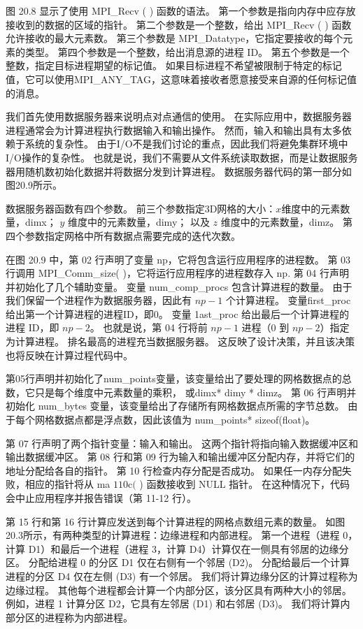 图 20.8 显示了使用 MPI\_Recv ( ) 函数的语法。 第一个参数是指向内存中应存放接收到的数据的区域的指针。 
第二个参数是一个整数，给出 MPI\_Recv ( ) 函数允许接收的最大元素数。 
第三个参数是 MPI\_Datatype，它指定要接收的每个元素的类型。 第四个参数是一个整数，给出消息源的进程 ID。 
第五个参数是一个整数，指定目标进程期望的标记值。 
如果目标进程不希望被限制于特定的标记值，它可以使用MPI\_ANY\_TAG，这意味着接收者愿意接受来自源的任何标记值的消息。

我们首先使用数据服务器来说明点对点通信的使用。 在实际应用中，数据服务器进程通常会为计算进程执行数据输入和输出操作。 
然而，输入和输出具有太多依赖于系统的复杂性。 由于I/O不是我们讨论的重点，因此我们将避免集群环境中I/O操作的复杂性。 
也就是说，我们不需要从文件系统读取数据，而是让数据服务器用随机数初始化数据并将数据分发到计算进程。 
数据服务器代码的第一部分如图20.9所示。

数据服务器函数有四个参数。 前三个参数指定3D网格的大小：$x$维度中的元素数量，dimx； $y$ 维度中的元素数量，dimy； 
以及 $z$ 维度中的元素数量，dimz。 第四个参数指定网格中所有数据点需要完成的迭代次数。

在图 20.9 中，第 02 行声明了变量 np，它将包含运行应用程序的进程数。 
第 03 行调用 MPI\_Comm\_size( )，它将运行应用程序的进程数存入 np. 第 04 行声明并初始化了几个辅助变量。 
变量 num\_comp\_procs 包含计算进程的数量。 由于我们保留一个进程作为数据服务器，因此有 $n p-1$ 个计算进程。 
变量first\_proc给出第一个计算进程的进程ID，即0。 变量 1ast\_proc 给出最后一个计算进程的进程 ID，即 $n p-2$。 
也就是说，第 04 行将前 $n p-1$ 进程（0 到 $n p-2$）指定为计算进程。 排名最高的进程充当数据服务器。 
这反映了设计决策，并且该决策也将反映在计算过程代码中。

第05行声明并初始化了num\_points变量，该变量给出了要处理的网格数据点的总数，它只是每个维度中元素数量的乘积，
或dimx* dimy * dimz。 第 06 行声明并初始化 num\_bytes 变量，该变量给出了存储所有网格数据点所需的字节总数。 
由于每个网格数据点都是浮点数，因此该值为 num\_points* sizeof(float)。

第 07 行声明了两个指针变量：输入和输出。 这两个指针将指向输入数据缓冲区和输出数据缓冲区。 
第 08 行和第 09 行为输入和输出缓冲区分配内存，并将它们的地址分配给各自的指针。 第 10 行检查内存分配是否成功。 
如果任一内存分配失败，相应的指针将从 ma $110 \mathrm{c}($ ) 函数接收到 NULL 指针。 
在这种情况下，代码会中止应用程序并报告错误（第 11-12 行）。

第 15 行和第 16 行计算应发送到每个计算进程的网格点数组元素的数量。 
如图20.3所示，有两种类型的计算进程：边缘进程和内部进程。 
第一个进程（进程 0，计算 D1）和最后一个进程（进程 3，计算 D4）计算仅在一侧具有邻居的边缘分区。 
分配给进程 0 的分区 D1 仅在右侧有一个邻居 (D2)。 分配给最后一个计算进程的分区 D4 仅在左侧 (D3) 有一个邻居。 
我们将计算边缘分区的计算过程称为边缘过程。 其他每个进程都会计算一个内部分区，该分区具有两种大小的邻居。 
例如，进程 1 计算分区 D2，它具有左邻居 (D1) 和右邻居 (D3)。 我们将计算内部分区的进程称为内部进程。

